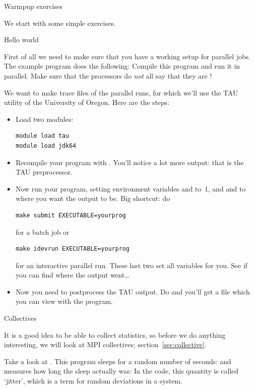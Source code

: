  {Warmpup exercises}

We start with some simple exercises.

 {Hello world}

First of all we need to make sure that you have a working setup for
parallel jobs. The example program  does the
following:
Compile this program and run it in parallel. Make sure that the processors
do \emph{not} all say that they are !

\begin{istc}
  We want to make trace files of the parallel runs, for which we'll
  use the TAU utility of the University of Oregon. Here are the steps:
  \begin{itemize}
  \item Load two modules:
\begin{verbatim}
module load tau
module load jdk64
\end{verbatim}
  \item Recompile your program with . You'll notice a
    lot more output: that is the TAU preprocessor.
  \item Now run your program, setting environment variables
     and  to~1, and  and
     to where you want the output to be.  Big shortcut:
    do 
\begin{verbatim}
make submit EXECUTABLE=yourprog
\end{verbatim}
    for a batch job or 
\begin{verbatim}
make idevrun EXECUTABLE=yourprog
\end{verbatim}
    for an interactive parallel
    run. These last two set all variables for you. See if you can find
    where the output went\ldots
  \item Now you need to postprocess the TAU output. Do  and you'll get a file
     which you can view with the 
    program.
  \end{itemize}
\end{istc}

 {Collectives}

It is a good idea to be able to collect statistics, so before we do
anything interesting, we will look at MPI collectives;
section~\ref{sec:collective}.

Take a look at . This program sleeps for a random
number of seconds: 
and measures how long the sleep actually was:
In the code, this quantity is called `jitter', which is a term
for random deviations in a system.

